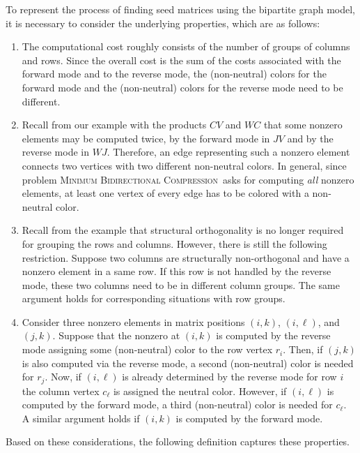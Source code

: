 \documentclass[12pt, twoside,a4paper,toc=bibliography]{scrbook}
\newcommand{\MinBidCom}{\textsc{Minimum Bidirectional Compression}}
\begin{document}
To represent the process of finding seed matrices using the bipartite graph model, it is
necessary to consider the underlying properties, which are as follows:
\begin{enumerate}
\item The computational cost roughly consists of the number of groups of columns and
rows. Since the overall cost is the sum of the costs associated with the forward mode
and to the reverse mode, the (non-neutral) colors for the forward mode and the
(non-neutral) colors for the reverse mode need to be different.

\item Recall from our example with the products $CV$ and $WC$ that some nonzero
elements may be computed twice, by the forward mode in $JV$ and by the reverse mode
in $WJ$. Therefore, an edge representing such a nonzero element connects two
vertices with two different non-neutral colors. In general, since problem
\MinBidCom\ asks for computing \emph{all} nonzero elements, at least one vertex of
every edge has to be colored with a non-neutral color.

\item Recall from the example that structural orthogonality is no longer required for
grouping the rows and columns. However, there is still the following restriction.
Suppose two columns are structurally non-orthogonal and have a nonzero element in a
same row. If this row is not handled by the reverse mode, these two columns need to
be in different column groups. The same argument holds for corresponding situations
with row groups.

\item Consider three nonzero elements in matrix positions $(i,k)$, $(i,\ell)$, and
$(j,k)$. Suppose that the nonzero at $(i,k)$ is computed by the reverse mode
assigning some (non-neutral) color to the row vertex $r_i$. Then, if $(j,k)$ is
also computed via the reverse mode, a second (non-neutral) color is needed for
$r_j$. Now, if $(i,\ell)$ is already determined by the reverse mode for row $i$ the
column vertex $c_\ell$ is assigned the neutral color. However, if $(i,\ell)$ is
computed by the forward mode, a third (non-neutral) color is needed for $c_\ell$. A
similar argument holds if $(i,k)$ is computed by the forward mode.

\end{enumerate}

Based on these considerations, the following definition captures these properties.
\end{document}
